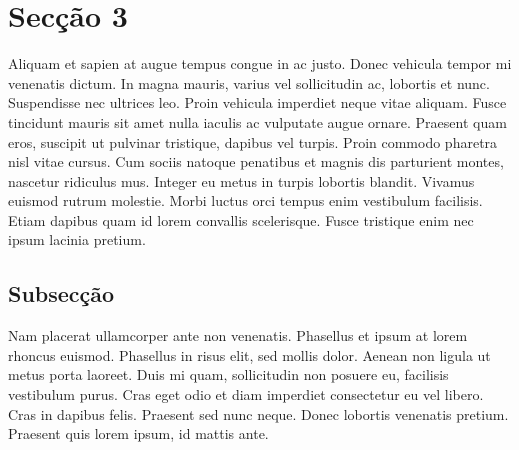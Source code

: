 \section{Secção 3} \label{sec3}
Aliquam et sapien at augue tempus congue in ac justo. Donec vehicula tempor mi venenatis dictum. In magna mauris, varius vel sollicitudin ac, lobortis et nunc. Suspendisse nec ultrices leo. Proin vehicula imperdiet neque vitae aliquam. Fusce tincidunt mauris sit amet nulla iaculis ac vulputate augue ornare. Praesent quam eros, suscipit ut pulvinar tristique, dapibus vel turpis. Proin commodo pharetra nisl vitae cursus. Cum sociis natoque penatibus et magnis dis parturient montes, nascetur ridiculus mus. Integer eu metus in turpis lobortis blandit. Vivamus euismod rutrum molestie. Morbi luctus orci tempus enim vestibulum facilisis. Etiam dapibus quam id lorem convallis scelerisque. Fusce tristique enim nec ipsum lacinia pretium.

\subsection{Subsecção}

Nam placerat ullamcorper ante non venenatis. Phasellus et ipsum at lorem rhoncus euismod. Phasellus in risus elit, sed mollis dolor. Aenean non ligula ut metus porta laoreet. Duis mi quam, sollicitudin non posuere eu, facilisis vestibulum purus. Cras eget odio et diam imperdiet consectetur eu vel libero. Cras in dapibus felis. Praesent sed nunc neque. Donec lobortis venenatis pretium. Praesent quis lorem ipsum, id mattis ante. 

